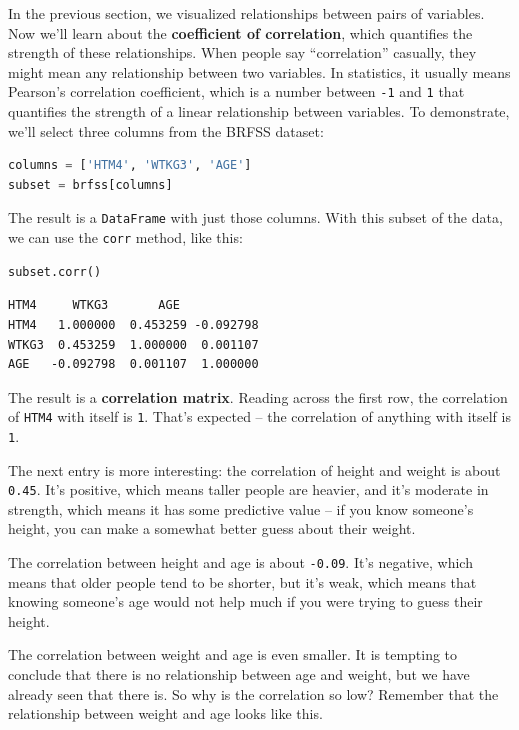 In the previous section, we visualized relationships between pairs of
variables. Now we'll learn about the \textbf{coefficient of
correlation}, which quantifies the strength of these relationships. When
people say ``correlation'' casually, they might mean any relationship
between two variables. In statistics, it usually means Pearson's
correlation coefficient, which is a number between
\passthrough{\lstinline!-1!} and \passthrough{\lstinline!1!} that
quantifies the strength of a linear relationship between variables. To
demonstrate, we'll select three columns from the BRFSS dataset:

\begin{lstlisting}[language=Python,style=source]
columns = ['HTM4', 'WTKG3', 'AGE']
subset = brfss[columns]
\end{lstlisting}

The result is a \passthrough{\lstinline!DataFrame!} with just those
columns. With this subset of the data, we can use the
\passthrough{\lstinline!corr!} method, like this:

\begin{lstlisting}[language=Python,style=source]
subset.corr()
\end{lstlisting}

\begin{lstlisting}[style=output]
           HTM4     WTKG3       AGE
HTM4   1.000000  0.453259 -0.092798
WTKG3  0.453259  1.000000  0.001107
AGE   -0.092798  0.001107  1.000000
\end{lstlisting}

The result is a \textbf{correlation matrix}. Reading across the first
row, the correlation of \passthrough{\lstinline!HTM4!} with itself is
\passthrough{\lstinline!1!}. That's expected -- the correlation of
anything with itself is \passthrough{\lstinline!1!}.

The next entry is more interesting: the correlation of height and weight
is about \passthrough{\lstinline!0.45!}. It's positive, which means
taller people are heavier, and it's moderate in strength, which means it
has some predictive value -- if you know someone's height, you can make
a somewhat better guess about their weight.

The correlation between height and age is about
\passthrough{\lstinline!-0.09!}. It's negative, which means that older
people tend to be shorter, but it's weak, which means that knowing
someone's age would not help much if you were trying to guess their
height.

The correlation between weight and age is even smaller. It is tempting
to conclude that there is no relationship between age and weight, but we
have already seen that there is. So why is the correlation so low?
Remember that the relationship between weight and age looks like this.

